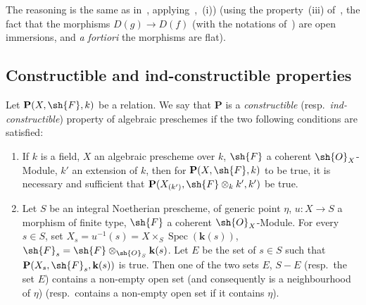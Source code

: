 The reasoning is the same as in~, applying~,~(i)) (using the property~(iii) of~, the fact that the morphisms $D(g)\to D(f)$ (with the notations of~) are open immersions, and \emph{a fortiori} the morphisms are flat).

\subsection{Constructible and ind-constructible properties}
\label{subsection:IV.9.2}

\begin{definition}[9.2.1]
\label{IV.9.2.1}
Let $\mathbf{P}(X,\sh{F},k)$ be a relation.
We say that $\mathbf{P}$ is a \emph{constructible} (resp.\ \emph{ind-constructible}) property of algebraic preschemes if the two following conditions are satisfied:
\begin{enumerate}[label=(\roman*)]
  \item If $k$ is a field, $X$ an algebraic prescheme over $k$, $\sh{F}$ a coherent $\sh{O}_X$-Module, $k'$ an extension of $k$, then for $\mathbf{P}(X,\sh{F},k)$ to be true, it is necessary and sufficient that $\mathbf{P}(X_{(k')},\sh{F}\otimes_k k',k')$ be true.
  \item Let $S$ be an integral Noetherian prescheme, of generic point $\eta$, $u:X\to S$ a morphism of finite type, $\sh{F}$ a coherent $\sh{O}_X$-Module.
For every $s\in S$, set $X_s=u^{-1}(s)=X\times_S\operatorname{Spec}(\mathbf{k}(s))$, $\sh{F}_s=\sh{F}\otimes_{\sh{O}_S}\mathbf{k}(s)$.
Let $E$ be the set of $s\in S$ such that $\mathbf{P}(X_s,\sh{F}_s,\mathbf{k}(s))$ is true.
Then one of the two sets $E$, $S-E$ (resp.\ the set $E$) contains a non-empty open set (and consequently is a neighbourhood of $\eta$) (resp.\ contains a non-empty open set if it contains $\eta$).
\end{enumerate}
\end{definition}


